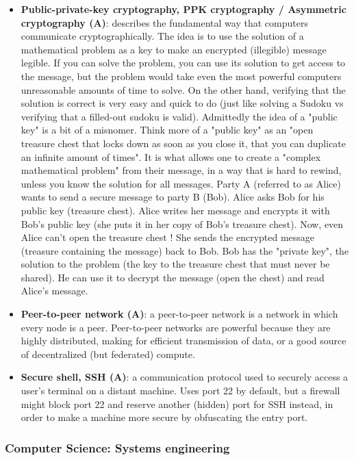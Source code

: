 \documentclass{article}
\begin{document}
\begin{itemize}
	\item \textbf{Public-private-key cryptography, PPK cryptography / Asymmetric cryptography (A)}: describes the fundamental way that computers communicate cryptographically. The idea is to use the solution of a mathematical problem as a key to make an encrypted (illegible) message legible. If you can solve the problem, you can use its solution to get access to the message, but the problem would take even the most powerful computers unreasonable amounts of time to solve. On the other hand, verifying that the solution is correct is very easy and quick to do (just like solving a Sudoku vs verifying that a filled-out sudoku is valid). Admittedly the idea of a "public key" is a bit of a misnomer. Think more of a "public key" as an "open treasure chest that locks down as soon as you close it, that you can duplicate an infinite amount of times". It is what allows one to create a "complex mathematical problem" from their message, in a way that is hard to rewind, unless you know the solution for all messages. Party A (referred to as Alice) wants to send a secure message to party B (Bob). Alice asks Bob for his public key (treasure chest). Alice writes her message and encrypts it with Bob's public key (she puts it in her copy of Bob's treasure chest). Now, even Alice can't open the treasure chest ! She sends the encrypted message (treasure containing the message) back to Bob. Bob has the "private key", the solution to the problem (the key to the treasure chest that must never be shared). He can use it to decrypt the message (open the chest) and read Alice's message.

	\item \textbf{Peer-to-peer network (A)}: a peer-to-peer network is a network in which every node is a peer. Peer-to-peer networks are powerful because they are highly distributed, making for efficient transmission of data, or a good source of decentralized (but federated) compute.

	\item \textbf{Secure shell, SSH (A)}: a communication protocol used to securely access a user's terminal on a distant machine. Uses port 22 by default, but a firewall might block port 22 and reserve another (hidden) port for SSH instead, in order to make a machine more secure by obfuscating the entry port.

\end{itemize}



\subsubsection*{Computer Science: Systems engineering}
\end{document}
